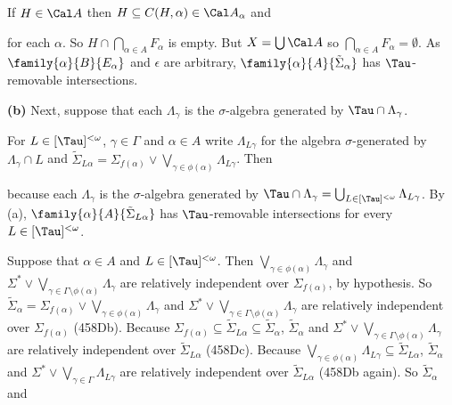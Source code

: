 {\noindent If $H\in\Cal A$ then $H\subseteq C(H,\alpha)\in\Cal A_{\alpha}$
and


\noindent for each $\alpha$.   So $H\cap\bigcap_{\alpha\in A}F_{\alpha}$ is
empty.   But $X=\bigcup\Cal A$ so
$\bigcap_{\alpha\in A}F_{\alpha}=\emptyset$.   As
$\family{\alpha}{B}{E_{\alpha}}$ and $\epsilon$ are arbitrary,
$\family{\alpha}{A}{\tilde\Sigma_{\alpha}}$ has
$\Tau$-removable intersections.

\medskip

{\bf (b)} Next, suppose that each $\Lambda_{\gamma}$ is the
$\sigma$-algebra generated by $\Tau\cap\Lambda_{\gamma}$.

\medskip

 For $L\in[\Tau]^{<\omega}$, $\gamma\in\Gamma$ and $\alpha\in A$
write $\Lambda_{L\gamma}$ for the algebra $\sigma$-generated by
$\Lambda_{\gamma}\cap L$ and $\tilde\Sigma_{L\alpha}
=\Sigma_{f(\alpha)}\vee\bigvee_{\gamma\in\phi(\alpha)}\Lambda_{L\gamma}$.
Then



\noindent because each $\Lambda_{\gamma}$ is the $\sigma$-algebra generated by
$\Tau\cap\Lambda_{\gamma}=\bigcup_{L\in[\Tau]^{<\omega}}\Lambda_{L\gamma}$.
By (a), $\family{\alpha}{A}{\tilde\Sigma_{L\alpha}}$ has $\Tau$-removable
intersections for every $L\in[\Tau]^{<\omega}$.

\medskip

 Suppose that $\alpha\in A$ and $L\in[\Tau]^{<\omega}$.
Then $\bigvee_{\gamma\in\phi(\alpha)}\Lambda_{\gamma}$ and
$\Sigma^*\vee\bigvee_{\gamma\in\Gamma\setminus\phi(\alpha)}\Lambda_{\gamma}$ are
relatively independent over $\Sigma_{f(\alpha)}$, by hypothesis.   So
$\tilde\Sigma_{\alpha}
=\Sigma_{f(\alpha)}\vee\bigvee_{\gamma\in\phi(\alpha)}\Lambda_{\gamma}$ and
$\Sigma^*\vee\bigvee_{\gamma\in\Gamma\setminus\phi(\alpha)}\Lambda_{\gamma}$ are
relatively independent over $\Sigma_{f(\alpha)}$ (458Db).
Because
$\Sigma_{f(\alpha)}\subseteq\tilde\Sigma_{L\alpha}
\subseteq\tilde\Sigma_{\alpha}$,
$\tilde\Sigma_{\alpha}$ and
$\Sigma^*\vee\bigvee_{\gamma\in\Gamma\setminus\phi(\alpha)}\Lambda_{\gamma}$ are
relatively independent over $\tilde\Sigma_{L\alpha}$ (458Dc).   Because
$\bigvee_{\gamma\in\phi(\alpha)}\Lambda_{L\gamma}\subseteq\tilde\Sigma_{L\alpha}$,
$\tilde\Sigma_{\alpha}$ and
$\Sigma^*\vee\bigvee_{\gamma\in\Gamma}\Lambda_{L\gamma}$ are relatively independent
over $\tilde\Sigma_{L\alpha}$ (458Db again).
So $\tilde\Sigma_{\alpha}$ and

}
